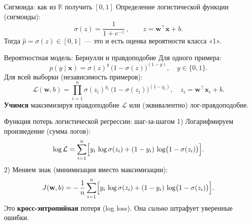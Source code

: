 \documentclass[11pt,aspectratio=169]{beamer}
\begin{document}
\begin{frame}{Сигмоида: как из \(\mathbb R\) получить \([0,1]\)}
	\small
	Определение логистической функции (сигмоиды):
	\begin{equation*}
		\sigma(z) = \frac{1}{1 + e^{-z}}\, , \qquad z = \mathbf w^\top \mathbf x + b.
	\end{equation*}
	Тогда \(\hat p = \sigma(z)\in[0,1]\) — это и есть оценка вероятности класса «1».

	\vspace{2mm}
\end{frame}

\begin{frame}{Вероятностная модель: Бернулли и правдоподобие}
	\small
	Для одного примера:
	\begin{equation*}
		p(y\mid \mathbf x) = \sigma(z)^y\, \bigl(1-\sigma(z)\bigr)^{(1-y)}, \quad y\in\{0,1\}.
	\end{equation*}
	Для всей выборки (независимость примеров):
	\begin{equation*}
		\mathcal L(\mathbf w,b) = \prod_{i=1}^n \sigma(z_i)^{y_i}\, \bigl(1-\sigma(z_i)\bigr)^{(1-y_i)}, \quad z_i=\mathbf w^\top\mathbf x_i+b.
	\end{equation*}
	\textbf{Учимся} максимизируя правдоподобие \(\mathcal L\) или (эквивалентно) лог-правдоподобие.
\end{frame}

\begin{frame}{Функция потерь логистической регрессии: шаг-за-шагом}
	\small
	1) Логарифмируем произведение (сумма логов):
	\begin{equation*}
		\log \mathcal L = \sum_{i=1}^n \Bigl[ y_i\,\log\sigma(z_i) + (1-y_i)\,\log\bigl(1-\sigma(z_i)\bigr) \Bigr].
	\end{equation*}
	2) Меняем знак (минимизация вместо максимизации):
	\begin{equation*}
		J(\mathbf w,b) = -\,\frac{1}{n}\sum_{i=1}^n \Bigl[ y_i\,\log\sigma(z_i) + (1-y_i)\,\log\bigl(1-\sigma(z_i)\bigr) \Bigr].
	\end{equation*}
	Это \textbf{кросс-энтропийная} потеря (log loss). Она \emph{сильно} штрафует уверенные ошибки.
\end{frame}
\end{document}
